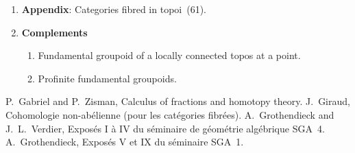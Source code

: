 \documentclass[10pt]{amsart}
\begin{document}
\begin{enumerate}[label=\arabic*.]
    I removed it in the corollary of Proposition~4.6.2, which directly describes the locally constant objects of the inductive limit.
    The advantage of the form (4.5) is to allow explicit calculations, which are developed in the points 4.6.3 and 4.6.7.
  \item[A.] \textbf{Appendix}: Categories fibred in topoi~(61).
  \item \textbf{Complements}
    \begin{enumerate}[label=5.\arabic*.]
      \item Fundamental groupoid of a locally connected topos at a point.
      \item Profinite fundamental groupoids.
    \end{enumerate}
\end{enumerate}

\begin{thebibliography}{4}
   P.~Gabriel and P.~Zisman, {Calculus of fractions and homotopy theory}.
   J.~Giraud, {Cohomologie non-ab\'elienne (pour les cat\'egories fibr\'ees)}.
   A.~Grothendieck and J.~L.~Verdier, {Expos\'es I \`a IV du s\'eminaire de g\'eom\'etrie alg\'ebrique SGA~4}.
   A.~Grothendieck, {Expos\'es V et IX du s\'eminaire SGA~1}.
\end{thebibliography}
\end{document}
